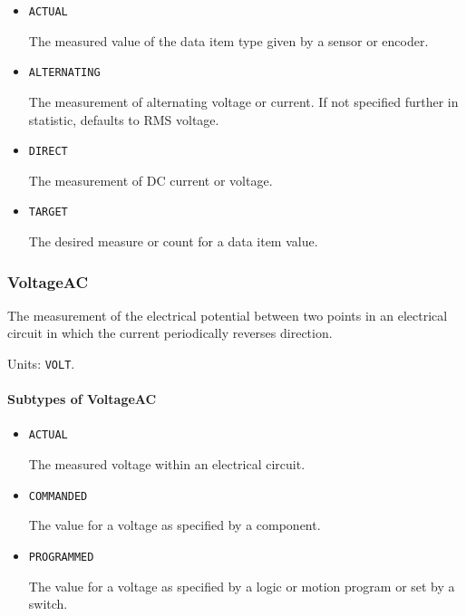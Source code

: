 \begin{itemize}

\item \texttt{ACTUAL}


The measured value of the data item type given by a sensor or encoder.

\item \texttt{ALTERNATING}


The measurement of alternating voltage or current.   If not specified further in statistic, defaults to RMS voltage. 

\item \texttt{DIRECT}


The measurement of DC current or voltage.

\item \texttt{TARGET}


The desired measure or count for a data item value.


\end{itemize}

\subsubsection{VoltageAC}
\label{sec:VoltageAC}



The measurement of the electrical potential between two points in an electrical circuit in which the current periodically reverses direction.


Units: \texttt{VOLT}.

\paragraph{Subtypes of VoltageAC}\mbox{}
\label{sec:Subtypes of VoltageAC}

\begin{itemize}

\item \texttt{ACTUAL}


The measured voltage within an electrical circuit.

\item \texttt{COMMANDED}


The value for a voltage as specified by a  component.

\item \texttt{PROGRAMMED}


The value for a voltage as specified by a logic or motion program or set by a switch.


\end{itemize}

